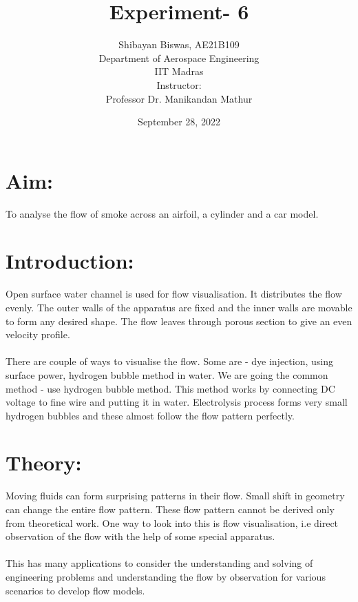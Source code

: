 \documentclass[12pt,a4paper]{article}
\author{ Shibayan Biswas, AE21B109\\ Department of Aerospace Engineering\\ IIT Madras\\[3ex] Instructor:\\ \large Professor Dr. Manikandan Mathur}
\title{Experiment- 6}
\date{September 28, 2022}
\begin{document}
\maketitle
\hline
\section{Aim:}
To analyse the flow of smoke across an airfoil, a cylinder and a car model.
\section{Introduction:}
Open surface water channel is used for flow visualisation. It distributes the flow evenly. The outer walls of the apparatus are fixed and the inner walls are movable to form any desired shape. The flow leaves through porous section to give an even velocity profile.\\
\\There are couple of ways to visualise the flow. Some are - dye injection, using surface power, hydrogen bubble method in water. We are going the common method - use hydrogen bubble method. This method works by connecting DC voltage to fine wire and
putting it in water. Electrolysis process forms very small hydrogen bubbles and these
almost follow the flow pattern perfectly.
\section{Theory:}
Moving fluids can form surprising patterns in their flow. Small shift in geometry can
change the entire flow pattern. These flow pattern cannot be derived only from theoretical work. One way to look into this is flow visualisation, i.e direct observation of the flow with the help of some special apparatus.\\
\\This has many applications to consider the understanding and solving of engineering problems and understanding the flow by observation for various scenarios to develop flow models.
\end{document}
